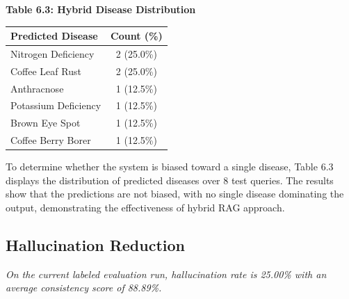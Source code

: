 \documentclass[conference]{IEEEtran}
\begin{document}
\begin{table}[htbp]
\centering
\textbf{Table 6.3: Hybrid Disease Distribution}\\[2pt]
\begin{tabular}{|l|c|}
\hline
\textbf{Predicted Disease} & \textbf{Count (\%)} \\
\hline
Nitrogen Deficiency & 2 (25.0\%) \\
\hline
Coffee Leaf Rust & 2 (25.0\%) \\
\hline
Anthracnose & 1 (12.5\%) \\
\hline
Potassium Deficiency & 1 (12.5\%) \\
\hline
Brown Eye Spot & 1 (12.5\%) \\
\hline
Coffee Berry Borer & 1 (12.5\%) \\
\hline
\end{tabular}
\par\medskip
\noindent To determine whether the system is biased toward a single disease, Table 6.3 displays the distribution of predicted diseases over 8 test queries. The results show that the predictions are not biased, with no single disease dominating the output, demonstrating the effectiveness of hybrid RAG approach.
\label{tab3}
\end{table}

\subsection{Hallucination Reduction}

\textit{On the current labeled evaluation run, hallucination rate is 25.00\% with an average consistency score of 88.89\%.}
\end{document}
